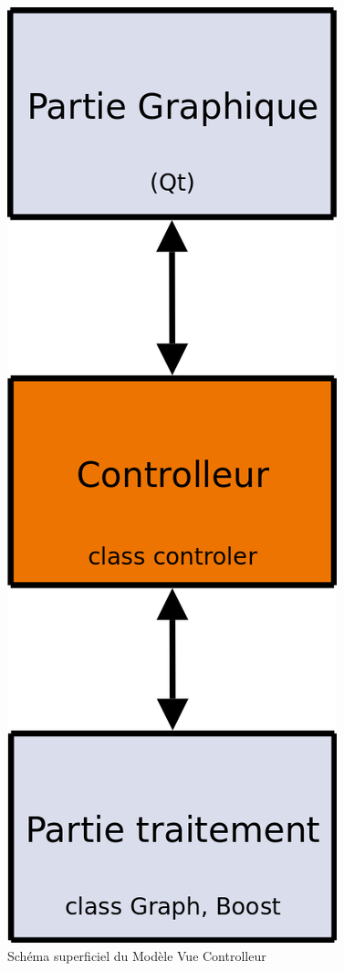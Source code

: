\begin{figure}[H]
\begin{center}
        \includegraphics[height=0.3\textheight]{./schema/mvcScheme.png}
\caption{Schéma superficiel du Modèle Vue Controlleur}
\label{mvc}
\end{center}
\end{figure}

